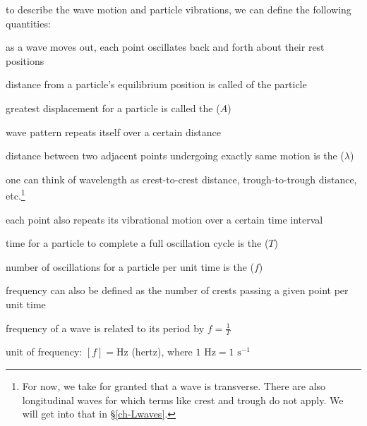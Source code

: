 to describe the wave motion and particle vibrations, we can define the following quantities:


\cmt as a wave moves out, each point oscillates back and forth about their rest positions

distance from a particle's equilibrium position is called  of the particle 

\cmt greatest displacement for a particle is called the  ($A$) 

\cmt wave pattern repeats itself over a certain distance

distance between two adjacent points undergoing exactly same motion is the  ($\lambda$) 

one can think of wavelength as crest-to-crest distance, trough-to-trough distance, etc.\footnote{For now, we take for granted that a wave is transverse. There are also longitudinal waves for which terms like crest and trough do not apply. We will get into that in \S\ref{ch-Lwaves}.}

\cmt each point also repeats its vibrational motion over a certain time interval

time for a particle to complete a full oscillation cycle is the   ($T$) 

\cmt number of oscillations for a particle per unit time is the  ($f$) 

frequency can also be defined as the number of crests passing a given point per unit time

frequency of a wave is related to its period by $\boxed{f=\frac{1}{T}}$

unit of frequency: $[f] = \text{Hz}$ (hertz), where $1 \text{ Hz} = 1 \text{ s}^{-1}$

